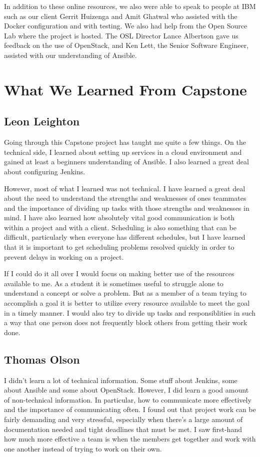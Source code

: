 \documentclass[10pt,letterpaper,onecolumn,draftclsnofoot]{IEEEtran}
\begin{document}
In addition to these online resources, we also were able to speak to people at IBM such as our client Gerrit Huizenga
and Amit Ghatwal who assisted with the Docker configuration and with testing. We also had help from the Open Source
Lab where the project is hosted. The OSL Director Lance Albertson gave us feedback on the use of OpenStack, and Ken
Lett, the Senior Software Engineer, assisted with our understanding of Ansible.
\clearpage
\section{What We Learned From Capstone}
\subsection{Leon Leighton}
Going through this Capstone project has taught me quite a few things.
On the technical side, I learned about setting up services in a cloud environment and gained at least a beginners
understanding of Ansible. I also learned a great deal about configuring Jenkins. 

However, most of what I learned was not technical. 
I have learned a great deal about the need to understand the strengths and weaknesses of ones teammates 
and the importance of dividing up tasks with those strengths and weaknesses in mind. 
I have also learned how absolutely vital good communication is both within a project and with a client. 
Scheduling is also something that can be difficult, particularly when everyone has different schedules, but
I have learned that it is important to get scheduling problems resolved quickly in order to prevent delays
in working on a project.

If I could do it all over I would focus on making better use of the resources available to me.
As a student it is sometimes useful to struggle alone to understand a concept or solve a problem.
But as a member of a team trying to accomplish a goal it is better to utilize every resource available to 
meet the goal in a timely manner.
I would also try to divide up tasks and responsiblities in such a way that one person does not frequently 
block others from getting their work done. 


\subsection{Thomas Olson}
I didn't learn a lot of technical information. Some stuff about Jenkins, some about Ansible and some about OpenStack.
However, I did learn a good amount of non-technical information. In particular, how to communicate more effectively and
the importance of communicating often. I found out that project work can be fairly demanding and very stressful,
especially when there's a large amount of documentation needed and tight deadlines that must be met. I saw first-hand
how much more effective a team is when the members get together and work with one another instead of trying to work
on their own.
\end{document}
